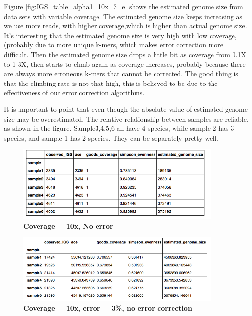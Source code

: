 
Figure \ref{fig:IGS_table_alpha1_10x_3_e} shows the estimated genome size from data sets with variable coverage.
The estimated genome size keeps increasing as we use more reads, with higher coverage,which is  higher than actual genome size.
It's interesting that the estimated genome size is very high with low coverage, (probably due to more unique k-mers, which makes error correction more difficult. Then the estimated genome size drops a little bit as coverage from 0.1X to 1-3X, then starts to climb again as coverage increases, probably because there are always more erroneous k-mers that cannot be corrected. The good thing is that the climbing rate is not that high, this is believed to be due to the effectiveness of our error correction algorithms.

It is important to point that even though the absolute value of estimated genome size may be overestimated. The relative relationship between samples are reliable, as shown in the figure. Sample3,4,5,6 all have 4 species, while sample 2 has 3 species, and sample 1 has 2 species. They can be separately pretty well.


\begin{figure}[!ht]
 \centerline{\includegraphics[width=4in]{./figures/IGS_table_alpha1_10x_0.png}}
\caption{\bf Coverage = 10x, No error}
\label{fig:IGS_table_alpha1_10x_0}
\end{figure}


\begin{figure}[!ht]
 \centerline{\includegraphics[width=4in]{./figures/IGS_table_alpha1_10x_3_ne.png}}
\caption{\bf Coverage = 10x, error = 3\%, no error correction}
\label{fig:IGS_table_alpha1_10x_3_ne}
\end{figure}



